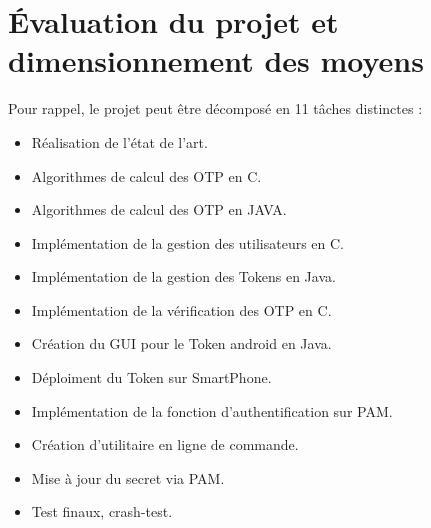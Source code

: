 \documentclass{../../res/univ-projet}
\begin{document}
\section{Évaluation du projet et dimensionnement des moyens}
	Pour rappel, le projet peut être décomposé en 11 tâches distinctes :
	\begin{itemize}
	  \item Réalisation de l'état de l'art.
	  \item Algorithmes de calcul des OTP en C.
	  \item Algorithmes de calcul des OTP en JAVA.
	  \item Implémentation de la gestion des utilisateurs en C.
	  \item Implémentation de la gestion des Tokens en Java.
	  \item Implémentation de la vérification des OTP en C.
	  \item Création du GUI pour le Token android en Java.
	  \item Déploiment du Token sur SmartPhone.
	  \item Implémentation de la fonction d'authentification sur PAM.
	  \item Création d'utilitaire en ligne de commande.
	  \item Mise à jour du secret via PAM.
	  \item Test finaux, crash-test.
	\end{itemize}
\end{document}
